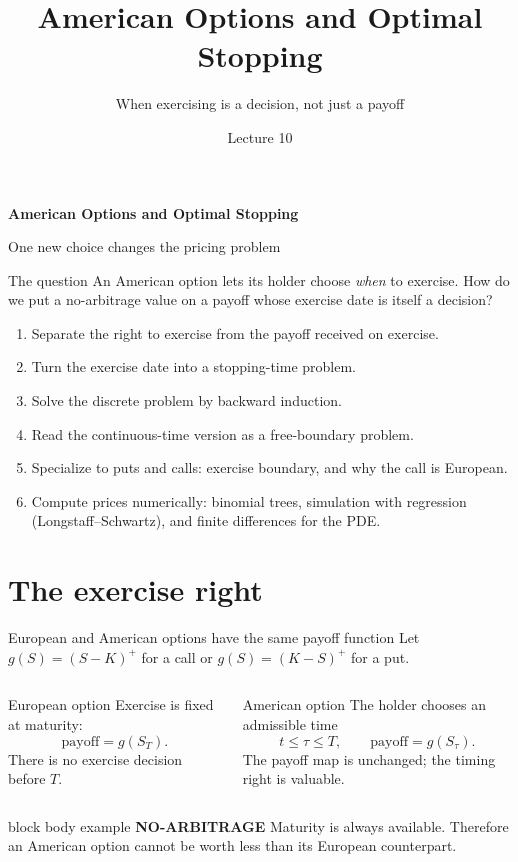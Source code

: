 \documentclass[handout,10pt,aspectratio=169]{beamer}
\title{American Options and Optimal Stopping}
\subtitle{When exercising is a decision, not just a payoff}
\author{}
\date{Lecture 10}
\newenvironment{marketbox}{\begin{beamercolorbox}[rounded=true,sep=0.7em,wd=\textwidth]{block body example}
  \textbf{\color{CourseGreen}NO-ARBITRAGE}\quad}{\end{beamercolorbox}}
\begin{document}
\begin{frame}[plain]
  \vfill
  {\LARGE\bfseries\color{CourseBlue}American Options and Optimal Stopping\par}
  \medskip{\color{CourseGold}\rule{0.94\textwidth}{0.8pt}}
  \vfill
\end{frame}

\begin{frame}{One new choice changes the pricing problem}
\begin{block}{The question}
An American option lets its holder choose \emph{when} to exercise. How do we
put a no-arbitrage value on a payoff whose exercise date is itself a decision?
\end{block}
\begin{enumerate}
  \item Separate the right to exercise from the payoff received on exercise.
  \item Turn the exercise date into a stopping-time problem.
  \item Solve the discrete problem by backward induction.
  \item Read the continuous-time version as a free-boundary problem.
  \item Specialize to puts and calls: exercise boundary, and why the call is European.
  \item Compute prices numerically: binomial trees, simulation with regression
        (Longstaff--Schwartz), and finite differences for the PDE.
\end{enumerate}
\end{frame}

\section{The exercise right}

\begin{frame}{European and American options have the same payoff function}
Let \(g(S)=(S-K)^+\) for a call or \(g(S)=(K-S)^+\) for a put.
\begin{columns}[T,onlytextwidth]
\begin{block}{European option}
Exercise is fixed at maturity:
\[
  \text{payoff}=g(S_T).
\]
There is no exercise decision before \(T\).
\end{block}
\begin{exampleblock}{American option}
The holder chooses an admissible time
\[
  t\leq\tau\leq T,\qquad \text{payoff}=g(S_\tau).
\]
The payoff map is unchanged; the timing right is valuable.
\end{exampleblock}
\end{columns}
\begin{marketbox}
Maturity is always available. Therefore an American option cannot be worth
less than its European counterpart.
\end{marketbox}
\end{frame}
\end{document}

